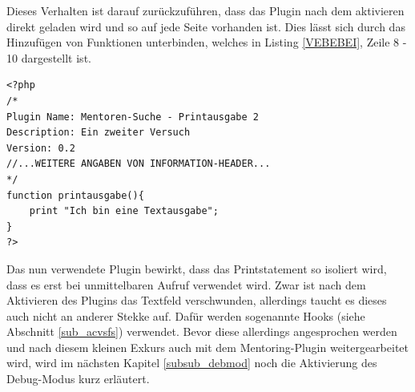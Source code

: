 Dieses Verhalten ist darauf zurückzuführen, dass das Plugin nach dem aktivieren direkt geladen wird und so auf jede Seite vorhanden ist.\newline
Dies lässt sich durch das Hinzufügen von Funktionen unterbinden, welches in Listing \ref{VEBEBEI}, Zeile 8 - 10 dargestellt ist. 
\begin{lstlisting}
<?php
/*
Plugin Name: Mentoren-Suche - Printausgabe 2
Description: Ein zweiter Versuch
Version: 0.2
//...WEITERE ANGABEN VON INFORMATION-HEADER...
*/
function printausgabe(){
	print "Ich bin eine Textausgabe";
}
?>
\end{lstlisting} 
Das nun verwendete Plugin bewirkt, dass das Printstatement so isoliert wird, dass es erst bei unmittelbaren Aufruf verwendet wird. \newline
Zwar ist nach dem Aktivieren des Plugins das Textfeld verschwunden, allerdings taucht es dieses auch nicht an anderer Stekke auf. Dafür werden sogenannte Hooks (siehe Abschnitt \ref{sub_acvsfs}) verwendet. \newline
Bevor diese allerdings angesprochen werden und nach diesem kleinen Exkurs auch mit dem Mentoring-Plugin weitergearbeitet wird, wird im nächsten Kapitel \ref{subsub_debmod} noch die Aktivierung des Debug-Modus kurz erläutert.
